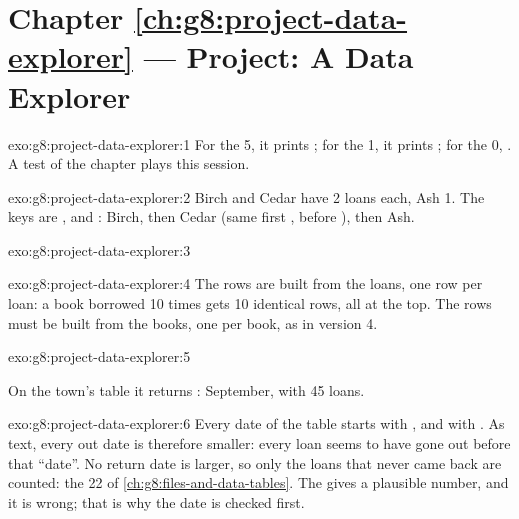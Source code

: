 \section*{Chapter \ref{ch:g8:project-data-explorer} --- Project: A Data Explorer}

\begin{solution}{exo:g8:project-data-explorer:1}
For the 5, it prints ; for the 1,
it prints ; for the 0, . A
test of the chapter plays this session.
\end{solution}

\begin{solution}{exo:g8:project-data-explorer:2}
Birch and Cedar have 2 loans each, Ash 1. The keys are \code{[-2, "Birch"]},
\code{[-2, "Cedar"]} and \code{[-1, "Ash"]}: Birch, then Cedar (same first
,  before ), then Ash.
\end{solution}

\begin{solution}{exo:g8:project-data-explorer:3}
\label{lst:g8:project-data-explorer:sol-author}
\end{solution}

\begin{solution}{exo:g8:project-data-explorer:4}
The rows are built from the loans, one row per loan: a book borrowed 10 times
gets 10 identical rows, all at the top. The rows must be built from the books,
one per book, as in version 4.
\end{solution}

\begin{solution}{exo:g8:project-data-explorer:5}
\label{lst:g8:project-data-explorer:sol-month}

On the town's table it returns : September, with 45 loans.
\end{solution}

\begin{solution}{exo:g8:project-data-explorer:6}
Every date of the table starts with , and  with
. As text, every out date is therefore smaller: every loan seems to
have gone out before that ``date''. No return date is larger, so only the
loans that never came back are counted: the 22 of
\cref{ch:g8:files-and-data-tables}. The  gives a plausible number, and
it is wrong; that is why the date is checked first.
\end{solution}

